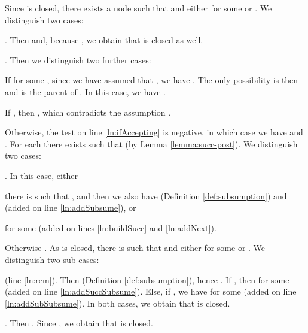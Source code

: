 \documentclass{llncs}
\begin{document}
{\begin{compactenum}[(1)]
    Since  is closed, there exists a node  such that
     and
    either  for some  or
    . We
    distinguish two cases:
    \begin{compactenum}[(a)]
    \item . Then  and, because
      , we obtain that  is closed as
      well.
\item . Then we distinguish two further cases:
      \begin{compactenum}[(i)]
      \item If  for some , since we have assumed that
        , we have . The only possibility is then
         and  is the
        parent of . In this case, we have
        . 
\item If ,
        then , which contradicts the assumption
        . 
      \end{compactenum}
    \end{compactenum}
\item Otherwise, the test on line \ref{ln:ifAccepting} is negative,
    in which case we have  and
    . For each  there
    exists  such that
     (by
    Lemma \ref{lemma:succ-post}). We distinguish two cases:
    \begin{compactenum}[(a)]
    \item . In this case, either\begin{inparaenum}[(i)]\item there is  such
        that , and then we also have
         (Definition \ref{def:subsumption}) and
         (added
        on line \ref{ln:addSubsume}), or
\item  for some 
        (added on lines \ref{ln:buildSucc} and \ref{ln:addNext}).
        \end{inparaenum}
\item Otherwise . As
       is closed, there is  such that
       and either  for some  or
      .  We
      distinguish two sub-cases: \begin{compactenum}[(i)]
        \item  (line \ref{ln:rem}).
          Then 
          (Definition \ref{def:subsumption}), hence
          . If , then
           for
          some  (added on line
          \ref{ln:addSuccSubsume}). Else, if
          , we
          have 
          for some  (added on line
          \ref{ln:addSubSubsume}). In both cases, we obtain that
           is closed.
\item . Then
          . Since , we obtain
          that  is closed.
        \end{compactenum}
    \end{compactenum}
  \end{compactenum}

}
\end{document}

